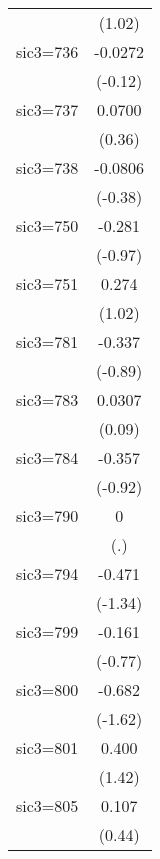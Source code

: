 \begin{table}[htbp]
\begin{tabular*}{0.8\hsize}{@{\hskip\tabcolsep\extracolsep\fill}l*{1}{c}}
                    &      (1.02)         \\
\addlinespace
sic3=736            &     -0.0272         \\
                    &     (-0.12)         \\
\addlinespace
sic3=737            &      0.0700         \\
                    &      (0.36)         \\
\addlinespace
sic3=738            &     -0.0806         \\
                    &     (-0.38)         \\
\addlinespace
sic3=750            &      -0.281         \\
                    &     (-0.97)         \\
\addlinespace
sic3=751            &       0.274         \\
                    &      (1.02)         \\
\addlinespace
sic3=781            &      -0.337         \\
                    &     (-0.89)         \\
\addlinespace
sic3=783            &      0.0307         \\
                    &      (0.09)         \\
\addlinespace
sic3=784            &      -0.357         \\
                    &     (-0.92)         \\
\addlinespace
sic3=790            &           0         \\
                    &         (.)         \\
\addlinespace
sic3=794            &      -0.471         \\
                    &     (-1.34)         \\
\addlinespace
sic3=799            &      -0.161         \\
                    &     (-0.77)         \\
\addlinespace
sic3=800            &      -0.682         \\
                    &     (-1.62)         \\
\addlinespace
sic3=801            &       0.400         \\
                    &      (1.42)         \\
\addlinespace
sic3=805            &       0.107         \\
                    &      (0.44)         \\

\end{tabular*}
\end{table}
